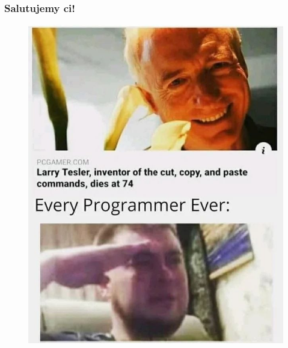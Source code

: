 \documentclass[10pt,t]{beamer}
\begin{document}
\begin{frame}
  \frametitle{Salutujemy ci!}


  \begin{figure}

    \centering


    \includegraphics[scale=0.25]
    {./PresentationsPictures/Copy-paste.jpg}

  \end{figure}

\end{frame}
\end{document}
